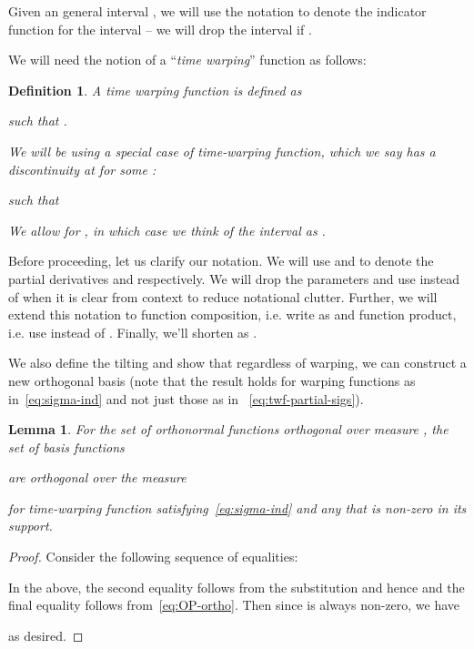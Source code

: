 \documentclass{article}
\newtheorem{lemma}{Lemma}[section]
\newtheorem{definition}{Definition}
\begin{document}
Given an general interval , we will use the notation  to denote the indicator function for the interval -- we will drop the interval if .

We will need the notion of a ``\emph{time warping}'' function  as follows:
\begin{definition}
A {\em time warping function} is defined as

such that .



We will be using a special case of time-warping function, which we say {\em has a discontinuity at}  for some :
  

such that










We allow for , in which case we think of the interval  as .
\label{def:twf}
\end{definition}



Before proceeding, let us clarify our notation. We will use  and  to denote the partial derivatives  and  respectively. We will drop the parameters  and use  instead of  when it is clear from context to reduce notational clutter. Further, we will extend this notation to function composition, i.e. write  as  and function product, i.e. use  instead of . Finally, we'll shorten  as .

We also define the tilting  and show that regardless of warping, we can construct a new orthogonal basis (note that the result holds for warping functions as in~\eqref{eq:sigma-ind} and not just those as in ~\eqref{eq:twf-partial-sigs}).





\begin{lemma}
\label{lem:new-ortho}
For the set of orthonormal functions  orthogonal over measure , the set of basis functions

are orthogonal over the measure

for time-warping function  satisfying~\eqref{eq:sigma-ind} and any  that is non-zero in its support.

\end{lemma}



\begin{proof}


Consider the following sequence of equalities:

In the above, the second equality follows from the substitution  and hence  and the final equality follows from~\eqref{eq:OP-ortho}.
Then since  is always non-zero, we have

as desired.
\end{proof}
\end{document}
